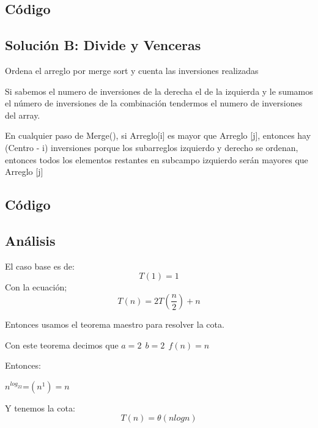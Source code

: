 \documentclass[12pt, fleqn]{article}                             %
\theoremstyle{break}                                            %
\begin{document}
\subsection{Código}


\subsection{Solución B: Divide y Venceras}
Ordena el arreglo por merge sort y cuenta las inversiones realizadas

Si sabemos el numero de inversiones de la derecha el de la izquierda y le sumamos el número
de inversiones de la combinación tendermos el numero de inversiones del array.


En cualquier paso de Merge(), si Arreglo[i] es mayor que Arreglo [j], entonces hay  (Centro - i) inversiones porque los subarreglos izquierdo y derecho se ordenan, entonces
todos los elementos restantes en subcampo izquierdo
serán mayores que Arreglo [j]
\subsection{Código}


\subsection{Análisis}
El caso base es de:
\begin{equation*}
    T(1)=1
\end{equation*}
Con la ecuación;
\begin{equation*}
    T(n)=2T(\dfrac{n}{2})+n
\end{equation*}

Entonces usamos el teorema maestro para resolver la cota.

Con este teorema decimos que $a=2\:\:b=2\:\:f(n)=n$

Entonces:


$n^{log_22}$=$(n^1)=n$

Y tenemos la cota:
\begin{equation*}
    T(n)=\theta(nlogn)
\end{equation*}
\end{document}
